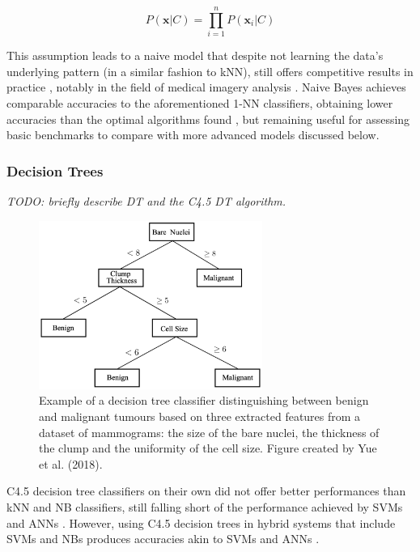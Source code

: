 \begin{equation}
\label{eq:naive-bayes}
    P(\textbf{x}|C)=\prod_{i=1}^{n}P(\textbf{x}_i|C)
\end{equation}

This assumption leads to a naive model that despite not learning the data's underlying pattern (in a similar fashion to kNN), still offers competitive results in practice \cite{russell2002artificial}, notably in the field of medical imagery analysis \cite{rish2001empirical}. Naive Bayes achieves comparable accuracies to the aforementioned 1-NN classifiers, obtaining lower accuracies than the optimal algorithms found \cite{Yue2018} \cite{Montazeri2016}, but remaining useful for assessing basic benchmarks to compare with more advanced models discussed below.

\subsubsection{Decision Trees}

\textit{TODO: briefly describe DT and the C4.5 DT algorithm.}

\begin{figure}[ht]
\centerline{\includegraphics[width=0.65\textwidth]{Dissertation/figures/litsurvey/dt.png}}
\caption{\label{fig:litsurvey-dt-example}Example of a decision tree classifier distinguishing between benign and malignant tumours based on three extracted features from a dataset of mammograms: the size of the bare nuclei, the thickness of the clump and the uniformity of the cell size. Figure created by Yue et al. (2018).}
\end{figure}

C4.5 decision tree classifiers on their own did not offer better performances than kNN and NB classifiers, still falling short of the performance achieved by SVMs and ANNs \cite{Yue2018} \cite{Asri2016}. However, using C4.5 decision trees in hybrid systems that include SVMs and NBs produces accuracies akin to SVMs and ANNs \cite{Yue2018}.

